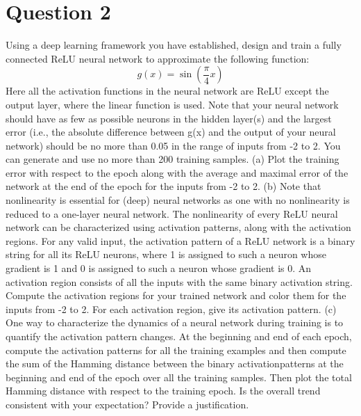 \documentclass[
	12pt, %
]{../Template/fphw}
\begin{document}

\section*{Question 2}

\begin{problem}
Using a deep learning framework you have established, design and train a fully connected
ReLU neural network to approximate the following function:
\begin{equation}
    g(x) = \sin\left(\frac{\pi}{4}x\right)
\end{equation}
Here all the activation functions in the neural network are ReLU except the output layer, where the linear function
is used. Note that your neural network should have as few as possible neurons in the hidden layer(s) and the
largest error (i.e., the absolute difference between g(x) and the output of your neural network) should be no more
than 0.05 in the range of inputs from -2 to 2. You can generate and use no more than 200 training samples.
(a) Plot the training error with respect to the epoch along with the average and maximal error of the network
at the end of the epoch for the inputs from -2 to 2.
(b) Note that nonlinearity is essential for (deep) neural networks as one with no nonlinearity is reduced to a
one-layer neural network. The nonlinearity of every ReLU neural network can be characterized using
activation patterns, along with the activation regions. For any valid input, the activation pattern of a ReLU
network is a binary string for all its ReLU neurons, where 1 is assigned to such a neuron whose gradient is
1 and 0 is assigned to such a neuron whose gradient is 0. An activation region consists of all the inputs
with the same binary activation string. Compute the activation regions for your trained network and color
them for the inputs from -2 to 2. For each activation region, give its activation pattern.
(c) One way to characterize the dynamics of a neural network during training is to quantify the activation
pattern changes. At the beginning and end of each epoch, compute the activation patterns for all the
training examples and then compute the sum of the Hamming distance between the binary activationpatterns at the beginning and end of the epoch over all the training samples. Then plot the total Hamming
distance with respect to the training epoch. Is the overall trend consistent with your expectation? Provide a
justification.
\end{problem}
\end{document}
